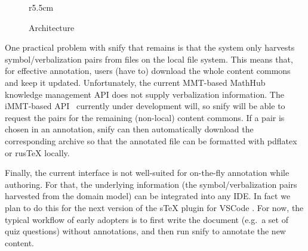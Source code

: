 \documentclass{llncs}
\newcommand\snify{\textsf{snify}\xspace}
\begin{document}
\begin{figure}r{5.5cm}
  \caption{Architecture}\label{fig:arch}\vspace*{-2em}
\end{figure}
One practical problem with \snify that remains is that the system only harvests
symbol/verbalization pairs from \sTeX files on the local file system. This means that, for
effective annotation, users (have to) download the whole content commons and keep it
updated. Unfortunately, the current MMT-based MathHub knowledge management
API does not supply verbalization information. The iMMT-based
API~\cite{iMMT:on} currently under development will, so \snify will be able to request the
pairs for the remaining (non-local) content commons. If a pair is chosen in an annotation,
\snify can then automatically download the corresponding archive so that the annotated
file can be formatted with pdflatex or rusTeX locally.

Finally, the current interface is not well-suited for on-the-fly annotation while
authoring.
For that, the underlying information (the symbol/verbalization pairs harvested
from the domain model) can be integrated into any IDE. In fact we plan to do this for the
next version of the sTeX plugin for VSCode \cite{sTeX-IDE:git}.
For now, the typical workflow of early adopters is to first write the document (e.g.\ a set of quiz questions) without annotations, and then run \snify to annotate the new content.
\end{document}

